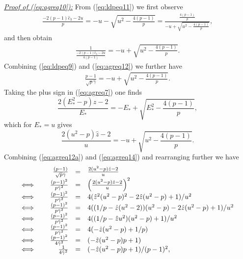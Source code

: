 \documentclass[10pt]{article}
\def\lp{\left (}
\def\rp{\right )}
\begin{document}
\noindent\underline{\emph{Proof of (\ref{eq:agreq10}):}} From (\ref{eq:ldpeq11}) we first observe
 \begin{eqnarray}
 \label{eq:agreq11}
\frac{-2(p-1)\hat{c}_{3}-2u}{p}   =  -u - \sqrt{ u^2 - \frac{4(p-1)}{p}   }
=   \frac{\frac{4(p-1)}{p}  }{-u + \sqrt{ u^2 - \frac{4(p-1)}{p}   } } ,
  \end{eqnarray}
and then obtain
 \begin{eqnarray}
 \label{eq:agreq12}
\frac{1}{\frac{-2(p-1)\hat{c}_{3}-2u}{4(p-1)} }  =  -u + \sqrt{ u^2 - \frac{4(p-1)}{p}   } .
  \end{eqnarray}
Combining (\ref{eq:ldpeq9})  and (\ref{eq:agreq12}) we further have
 \begin{eqnarray}
 \label{eq:agreq12a}
\frac{p-1}{\sqrt{p}\hat{\gamma}}  =  -u + \sqrt{ u^2 - \frac{4(p-1)}{p}   } .
  \end{eqnarray}
Taking the plus sign in (\ref{eq:agreq7}) one finds
\begin{equation}
\label{eq:agreq13}
\frac{2(E^2_*-p) \hat{z} - 2}{E_*} =  -E_*   +  \sqrt{E^2_* - \frac{4(p-1)}{p}    }   ,
 \end{equation}
which for $E_*=u$ gives
\begin{equation}
\label{eq:agreq14}
\frac{2(u^2-p) \hat{z} - 2}{u} =  -u   +  \sqrt{u^2 - \frac{4(p-1)}{p}    }   .
 \end{equation}
Combining (\ref{eq:agreq12a}) and (\ref{eq:agreq14}) and rearranging further we have
\begin{eqnarray}
\begin{array}{lrclcl}
  & \frac{(p-1)}{\sqrt{p}\hat{\gamma}}    & = &  \frac{2(u^2-p) \hat{z} - 2}{u}  \\
\Longleftrightarrow \quad $ $ & \frac{(p-1)^2}{p\hat{\gamma}^2}  & = & \lp \frac{2(u^2-p) \hat{z} - 2}{u}  \rp^2  \\
\Longleftrightarrow \quad $ $ & \frac{(p-1)^2}{p\hat{\gamma}^2}  & = & 4(\hat{z}^2(u^2-p)^2-2\hat{z}(u^2-p) +1 )/u^2  \\
\Longleftrightarrow \quad $ $ & \frac{(p-1)^2}{p\hat{\gamma}^2}  & = & 4((1/p-\hat{z}(u^2-2))(u^2-p)-2\hat{z}(u^2-p) +1 )/u^2  \\
\Longleftrightarrow \quad $ $ & \frac{(p-1)^2}{p\hat{\gamma}^2}  & = & 4((1/p-\hat{z}u^2)(u^2-p) +1 )/u^2 \\
\Longleftrightarrow \quad $ $ & \frac{(p-1)^2}{p\hat{\gamma}^2}  & = & 4(-\hat{z}(u^2-p) +1/p)  \\
\Longleftrightarrow \quad $ $ & \frac{(p-1)^2}{4\hat{\gamma}^2}  & = & (-\hat{z}(u^2-p)p +1)  \\
\Longleftrightarrow \quad $ $ & \frac{1}{4\hat{\gamma}^2}  & = & (-\hat{z}(u^2-p)p +1)/(p-1)^2 ,
\end{array}\label{eq:agreq15}
\end{eqnarray}
\end{document}
